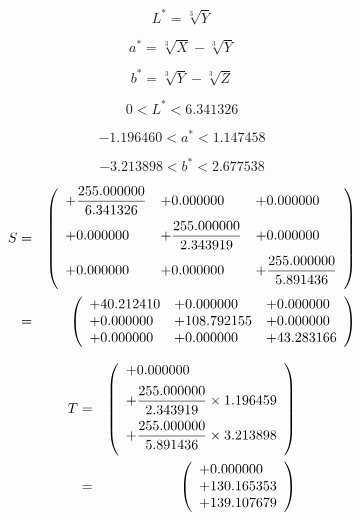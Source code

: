 \documentclass{article}
\begin{document}
\[ L^{*}=\sqrt[3]{Y} \]
\pagebreak

\[ a^{*}=\sqrt[3]{X} - \sqrt[3]{Y} \]
\pagebreak

\[ b^{*}=\sqrt[3]{Y} - \sqrt[3]{Z} \]
\pagebreak

\[ 0 < L^{*} < 6.341326 \]
\pagebreak

\[ -1.196460 < a^{*} < 1.147458 \]
\pagebreak

\[ -3.213898 < b^{*} < 2.677538 \]
\pagebreak

\begin{eqnarray*} S &=& \left( \begin{array}{lll} +\dfrac{255.000000}{6.341326} & +0.000000 & +0.000000 \vspace{.5em} \\ +0.000000 & +\dfrac{255.000000}{2.343919} & +0.000000 \vspace{.5em} \\ +0.000000 & +0.000000 & +\dfrac{255.000000}{5.891436} \vspace{.5em} \\ \end{array} \right) \\ &=& \left( \begin{array}{lll} +40.212410 & +0.000000 & +0.000000 \\ +0.000000 & +108.792155 & +0.000000 \\ +0.000000 & +0.000000 & +43.283166 \\ \end{array} \right) \\ \end{eqnarray*}
\pagebreak

\begin{eqnarray*} T &=& \left( \begin{array}{l} +0.000000 \vspace{.5em} \\ +\dfrac{255.000000}{2.343919}\times 1.196459 \vspace{.5em} \\ +\dfrac{255.000000}{5.891436}\times 3.213898 \vspace{.5em} \\ \end{array} \right) \\ &=& \left( \begin{array}{lll} +0.000000\\ +130.165353 \\ +139.107679 \\ \end{array} \right) \\ \end{eqnarray*}
\pagebreak
\end{document}
